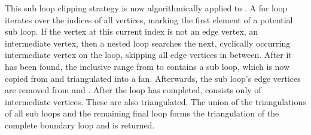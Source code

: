 This sub loop clipping strategy is now algorithmically applied to .
A for loop iterates over the indices of all vertices, marking the first element of a potential sub loop.
If the vertex at this current index is not an edge vertex, \ie an intermediate vertex, then a nested loop searches the next, cyclically occurring intermediate vertex on the loop, skipping all edge vertices in between.
After it has been found, the inclusive range from  to  contains a sub loop, which is now copied from  and triangulated into a fan.
Afterwards, the sub loop's edge vertices are removed from  and .
After the loop has completed,  consists only of intermediate vertices.
These are also triangulated.
The union of the triangulations of all sub loops and the remaining final loop forms the triangulation of the complete boundary loop and is returned.

